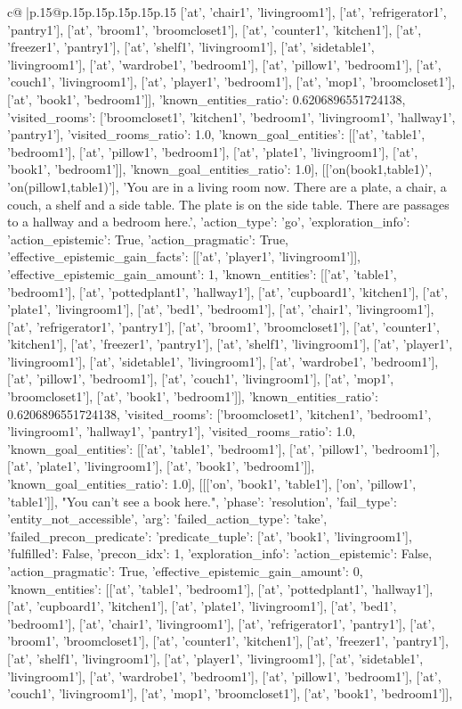 \documentclass{article}
\begin{document}
{\begin{supertabular}{c@{$\;$}|p{.15\linewidth}@{}p{.15\linewidth}p{.15\linewidth}p{.15\linewidth}p{.15\linewidth}p{.15\linewidth}}
{{{['at', 'chair1', 'livingroom1'], ['at', 'refrigerator1', 'pantry1'], ['at', 'broom1', 'broomcloset1'], ['at', 'counter1', 'kitchen1'], ['at', 'freezer1', 'pantry1'], ['at', 'shelf1', 'livingroom1'], ['at', 'sidetable1', 'livingroom1'], ['at', 'wardrobe1', 'bedroom1'], ['at', 'pillow1', 'bedroom1'], ['at', 'couch1', 'livingroom1'], ['at', 'player1', 'bedroom1'], ['at', 'mop1', 'broomcloset1'], ['at', 'book1', 'bedroom1']], 'known_entities_ratio': 0.6206896551724138, 'visited_rooms': ['broomcloset1', 'kitchen1', 'bedroom1', 'livingroom1', 'hallway1', 'pantry1'], 'visited_rooms_ratio': 1.0, 'known_goal_entities': [['at', 'table1', 'bedroom1'], ['at', 'pillow1', 'bedroom1'], ['at', 'plate1', 'livingroom1'], ['at', 'book1', 'bedroom1']], 'known_goal_entities_ratio': 1.0}}], [['on(book1,table1)', 'on(pillow1,table1)'], 'You are in a living room now. There are a plate, a chair, a couch, a shelf and a side table. The plate is on the side table. There are passages to a hallway and a bedroom here.', {'action_type': 'go', 'exploration_info': {'action_epistemic': True, 'action_pragmatic': True, 'effective_epistemic_gain_facts': [['at', 'player1', 'livingroom1']], 'effective_epistemic_gain_amount': 1, 'known_entities': [['at', 'table1', 'bedroom1'], ['at', 'pottedplant1', 'hallway1'], ['at', 'cupboard1', 'kitchen1'], ['at', 'plate1', 'livingroom1'], ['at', 'bed1', 'bedroom1'], ['at', 'chair1', 'livingroom1'], ['at', 'refrigerator1', 'pantry1'], ['at', 'broom1', 'broomcloset1'], ['at', 'counter1', 'kitchen1'], ['at', 'freezer1', 'pantry1'], ['at', 'shelf1', 'livingroom1'], ['at', 'player1', 'livingroom1'], ['at', 'sidetable1', 'livingroom1'], ['at', 'wardrobe1', 'bedroom1'], ['at', 'pillow1', 'bedroom1'], ['at', 'couch1', 'livingroom1'], ['at', 'mop1', 'broomcloset1'], ['at', 'book1', 'bedroom1']], 'known_entities_ratio': 0.6206896551724138, 'visited_rooms': ['broomcloset1', 'kitchen1', 'bedroom1', 'livingroom1', 'hallway1', 'pantry1'], 'visited_rooms_ratio': 1.0, 'known_goal_entities': [['at', 'table1', 'bedroom1'], ['at', 'pillow1', 'bedroom1'], ['at', 'plate1', 'livingroom1'], ['at', 'book1', 'bedroom1']], 'known_goal_entities_ratio': 1.0}}], [[['on', 'book1', 'table1'], ['on', 'pillow1', 'table1']], "You can't see a book here.", {'phase': 'resolution', 'fail_type': 'entity_not_accessible', 'arg': {'failed_action_type': 'take', 'failed_precon_predicate': {'predicate_tuple': ['at', 'book1', 'livingroom1'], 'fulfilled': False, 'precon_idx': 1}}, 'exploration_info': {'action_epistemic': False, 'action_pragmatic': True, 'effective_epistemic_gain_amount': 0, 'known_entities': [['at', 'table1', 'bedroom1'], ['at', 'pottedplant1', 'hallway1'], ['at', 'cupboard1', 'kitchen1'], ['at', 'plate1', 'livingroom1'], ['at', 'bed1', 'bedroom1'], ['at', 'chair1', 'livingroom1'], ['at', 'refrigerator1', 'pantry1'], ['at', 'broom1', 'broomcloset1'], ['at', 'counter1', 'kitchen1'], ['at', 'freezer1', 'pantry1'], ['at', 'shelf1', 'livingroom1'], ['at', 'player1', 'livingroom1'], ['at', 'sidetable1', 'livingroom1'], ['at', 'wardrobe1', 'bedroom1'], ['at', 'pillow1', 'bedroom1'], ['at', 'couch1', 'livingroom1'], ['at', 'mop1', 'broomcloset1'], ['at', 'book1', 'bedroom1']], }}}
\end{supertabular}}
\end{document}
